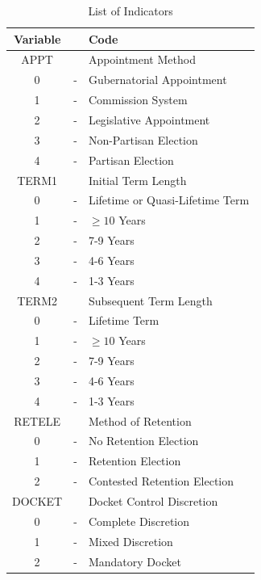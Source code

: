 \documentclass[12pt]{article}
\begin{document}
\begin{table}[!htb]\singlespacing\centering
	\caption{List of Indicators}\label{Indicators}
	
	\begin{tabular}{ccl}\hline
		\textbf{Variable}	&		&	\textbf{Code}	\\\hline\hline
		APPT	&		&	Appointment Method	\\
		0	&	-	&	Gubernatorial Appointment	\\
		1	&	-	&	Commission System	\\
		2	&	-	&	Legislative Appointment	\\
		3	&	-	&	Non-Partisan Election	\\
		4	&	-	&	Partisan Election	\\\hline
		TERM1	&		&	Initial Term Length	\\
		0	&	-	&	Lifetime or Quasi-Lifetime Term\\
		1	&	-	&	$\geq10$ Years	\\
		2	&	-	&	7-9 Years	\\
		3	&	-	&	4-6 Years	\\
		4	&	-	&	1-3 Years	\\\hline
		TERM2	&		&	Subsequent Term Length	\\
		0	&	-	&	Lifetime Term	\\
		1   &   -   &   $\geq10$ Years \\
		2	&	-	&	7-9 Years	\\
		3	&	-	&	4-6 Years	\\
		4	&	-	&	1-3 Years	\\\hline
		RETELE	&		&	Method of Retention	\\
		0	&	-	&	No Retention Election	\\
		1	&	-	&	Retention Election	\\
		2	&	-	&	Contested Retention Election	\\\hline
		DOCKET	&		&	Docket Control Discretion	\\
		0	&	-	&	Complete Discretion	\\
		1	&	-	&	Mixed Discretion	\\
		2	&	-	&	Mandatory Docket	\\\hline
	\end{tabular}
	
\end{table}
\end{document}
